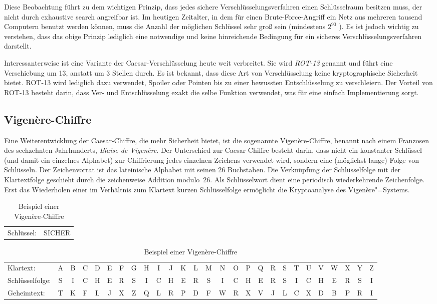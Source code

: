 Diese Beobachtung führt zu dem wichtigen Prinzip, dass jedes sichere Verschlüsselungsverfahren einen Schlüsselraum besitzen muss, der nicht durch exhaustive search angreifbar ist. Im heutigen Zeitalter, in dem für einen Brute-Force-Angriff ein Netz aus mehreren tausend Computern benutzt werden können, muss die Anzahl der möglichen Schlüssel sehr groß sein (mindestens $2^{90}$ \cite{Blaze1996}). Es ist jedoch wichtig zu verstehen, dass das obige Prinzip lediglich eine notwendige und keine hinreichende Bedingung für ein sicheres Verschlüsselungsverfahren darstellt.

Interessanterweise ist eine Variante der Caesar-Verschlüsselung heute weit verbreitet. Sie wird \emph{ROT-13} genannt und führt eine Verschiebung
um 13, anstatt um 3 Stellen durch. Es ist bekannt, dass diese Art von Verschlüsselung keine kryptographische Sicherheit bietet. ROT-13 wird lediglich dazu
verwendet, Spoiler oder Pointen bis zu einer bewussten Entschlüsselung zu verschleiern. Der Vorteil von ROT-13 besteht darin, dass Ver- und
Entschlüsselung exakt die selbe Funktion verwendet, was für eine einfach Implementierung sorgt.

\subsection{Vigen\`ere-Chiffre}
\label{ssec:vigenere}
Eine Weiterentwicklung der Caesar-Chiffre, die mehr Sicherheit bietet, ist die sogenannte Vigen\`ere-Chiffre, benannt nach einem Franzosen des
sechzehnten Jahrhunderts, \emph{Blaise de Vigen\`ere}. Der Unterschied zur Caesar-Chiffre besteht darin, dass nicht ein konstanter Schlüssel (und damit ein
einzelnes Alphabet) zur Chiffrierung jedes einzelnen Zeichens verwendet wird, sondern eine (möglichst lange) Folge von Schlüsseln. Der Zeichenvorrat ist das
lateinische Alphabet mit seinen 26 Buchstaben. Die Verknüpfung der Schlüsselfolge mit der Klartextfolge geschieht durch die zeichenweise Addition modulo~26.
Als Schlüsselwort dient eine periodisch wiederkehrende Zeichenfolge. Erst das Wiederholen einer im Verhältnis zum Klartext kurzen Schlüsselfolge
ermöglicht die Kryptoanalyse des Vigen\`ere"=Systems.

\begin{table}[h]
	\centering
	\setlength{\tabcolsep}{2pt}
	\begin{tabular}{ll}
		Schlüssel: 
		& SICHER
	\end{tabular}
	\begin{tabular}{l*{26}{c}}
		Klartext:
		&A&B&C&D&E&F&G&H&I&J&K&L&M&N&O&P&Q&R&S&T&U&V&W&X&Y&Z\\
		Schlüsselfolge:
		&S&I&C&H&E&R&S&I&C&H&E&R&S&I&C&H&E&R&S&I&C&H&E&R&S&I\\
		Geheimtext:
		&T&K&F&L&J&X&Z&Q&L&R&P&D&F&W&R&X&V&J&L&C&X&D&B&P&R&I\\
	\end{tabular}
	\caption{Beispiel einer Vigen\`ere-Chiffre}
\end{table}
\clearpage

